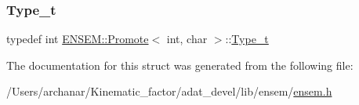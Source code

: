 \subsubsection{\texorpdfstring{Type\_t}{Type\_t}\hspace{0.1cm}{\footnotesize\ttfamily [2/2]}}
{\footnotesize\ttfamily typedef int \mbox{\hyperlink{structENSEM_1_1Promote}{E\+N\+S\+E\+M\+::\+Promote}}$<$ int, char $>$\+::\mbox{\hyperlink{structENSEM_1_1Promote_3_01int_00_01char_01_4_ac6a88a37a5f3bfdba13f61e4c901e8e0}{Type\+\_\+t}}}



The documentation for this struct was generated from the following file\+:\begin{DoxyCompactItemize}
\item 
/\+Users/archanar/\+Kinematic\+\_\+factor/adat\+\_\+devel/lib/ensem/\mbox{\hyperlink{lib_2ensem_2ensem_8h}{ensem.\+h}}\end{DoxyCompactItemize}
